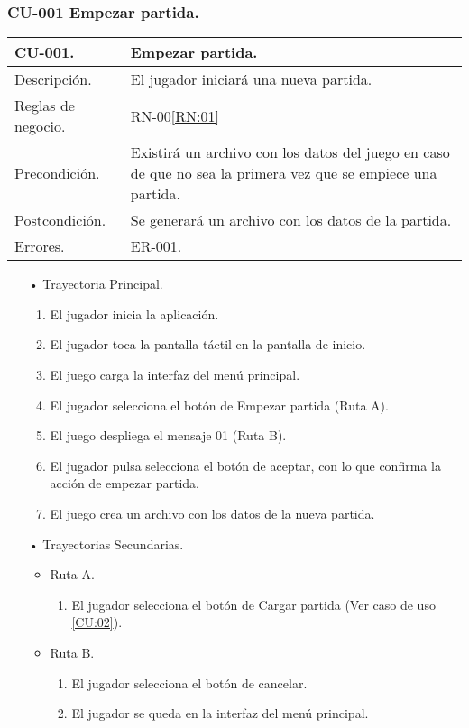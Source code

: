 \subsubsection{CU-001 Empezar partida.} \label{CU:01}
\begin{longtable}[c]{ | m{5cm} | m{10cm}|} 
		\hline
		\rowcolor{cyan}CU-001. & Empezar partida. \\ 
		\hline
		Descripción. & El jugador iniciará una nueva partida. \\ 
		\hline
		Reglas de negocio. & RN-00\ref{RN:01}\\ 
		\hline
		Precondición. & Existirá un archivo con los datos del juego en caso de que no sea la primera vez que se empiece una partida. \\
		\hline
		Postcondición. & Se generará un archivo con los datos de la partida.\\
		\hline
		Errores. & ER-001.\\
		\hline
\end{longtable}
\begin{itemize}
	\item[•] Trayectoria Principal.
		\begin{enumerate}
			\item El jugador inicia la aplicación.
			\item El jugador toca la pantalla táctil en la pantalla de inicio.
			\item El juego carga la interfaz del menú principal.
			\item El jugador selecciona el botón de Empezar partida (Ruta A).
			\item El juego despliega el mensaje 01 (Ruta B).
			\item El jugador pulsa selecciona el botón de aceptar, con lo que confirma la acción de empezar partida.
			\item El juego crea un archivo con los datos de la nueva partida.
		\end{enumerate}
	\item[•] Trayectorias Secundarias.
		\begin{itemize}
			\item Ruta A. 
				\begin{enumerate}
					\item El jugador selecciona el botón de Cargar partida (Ver caso de uso \ref{CU:02}).
				\end{enumerate}
			\item Ruta B.
				\begin{enumerate}
					\item El jugador selecciona el botón de cancelar.
					\item El jugador se queda en la interfaz del menú principal.
				\end{enumerate}
		\end{itemize}
\end{itemize}
